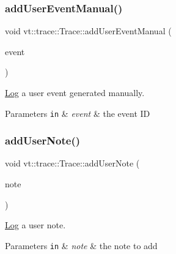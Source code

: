 \subsubsection{\texorpdfstring{add\+User\+Event\+Manual()}{addUserEventManual()}}
{\footnotesize\ttfamily void vt\+::trace\+::\+Trace\+::add\+User\+Event\+Manual (\begin{DoxyParamCaption}\item[{\hyperlink{namespacevt_1_1trace_a70c43e0e1596eea236912d4197d3120a}{User\+Spec\+Event\+I\+D\+Type}}]{event }\end{DoxyParamCaption})}



\hyperlink{structvt_1_1trace_1_1_log}{Log} a user event generated manually. 


\begin{DoxyParams}[1]{Parameters}
\mbox{\tt in}  & {\em event} & the event ID \\
\hline
\end{DoxyParams}
\mbox{\label{structvt_1_1trace_1_1_trace_a8be5309a84a6d0f99df0eb835fedf3b1}} 
\subsubsection{\texorpdfstring{add\+User\+Note()}{addUserNote()}}
{\footnotesize\ttfamily void vt\+::trace\+::\+Trace\+::add\+User\+Note (\begin{DoxyParamCaption}\item[{std\+::string const \&}]{note }\end{DoxyParamCaption})}



\hyperlink{structvt_1_1trace_1_1_log}{Log} a user note. 


\begin{DoxyParams}[1]{Parameters}
\mbox{\tt in}  & {\em note} & the note to add \\
\hline
\end{DoxyParams}
\mbox{\label{structvt_1_1trace_1_1_trace_a8f1a745228757b9d2ece4cd226d9540c}} 

